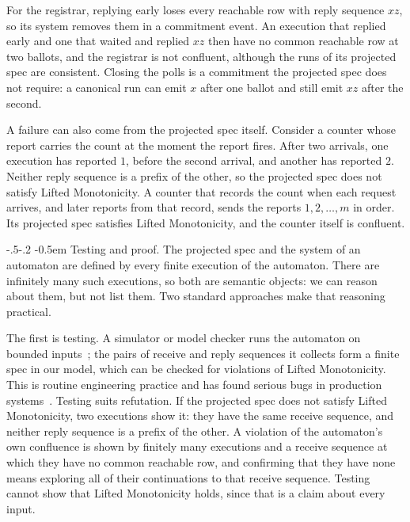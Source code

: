 \documentclass[sigconf]{cidr-2027}
\makeatletter
\theoremstyle{remark}
\renewcommand\paragraph{\@startsection{paragraph}{4}{\z@}%
  {-.5\baselineskip \@plus -2\p@ \@minus -.2\p@}%
  {-0.5em}%
  {\normalfont\bfseries}}
\newcommand{\commitment}{commitment\xspace}
\makeatother
\begin{document}
For the registrar, replying early loses every reachable row with reply
sequence $xz$, so its system removes them in a \commitment event. An execution
that replied early and one that waited and replied $xz$ then have no common
reachable row at two ballots, and the registrar is not confluent, although the
runs of its projected spec are consistent. Closing the polls is a \commitment the projected
spec does not require: a canonical run can emit $x$ after one ballot and still
emit $xz$ after the second.

A failure can also come from the projected spec itself. Consider a counter
whose report carries the count at the moment the report fires. After two
arrivals, one execution has reported $1$, before the second arrival, and
another has reported $2$. Neither reply sequence is a prefix of the other, so
the projected spec does not satisfy Lifted Monotonicity. A counter that records the count when each
request arrives, and later reports from that record, sends the reports
$1,2,\ldots,m$ in order. Its projected spec satisfies Lifted Monotonicity, and the counter
itself is confluent.

\paragraph{Testing and proof.}
The projected spec and the system of an automaton are defined by every finite
execution of the automaton. There are infinitely many such executions, so
both are semantic objects: we can reason about them, but not list them. Two
standard approaches make that reasoning practical.

The first is testing. A simulator or model checker runs the automaton on
bounded inputs~\cite{misra1986des,flanagan2005dpor}; the pairs of receive and
reply sequences it collects form a finite spec in our model, which can be
checked for violations of Lifted Monotonicity. This is routine engineering
practice and has found serious bugs in production
systems~\cite{newcombe2015aws,zhou2021foundationdb}. Testing suits
refutation. If the projected spec does not satisfy Lifted Monotonicity, two
executions show it:
they have the same receive sequence, and neither reply sequence is a prefix of
the other. A violation of the automaton's own confluence is shown by finitely
many executions and a receive sequence at which they have no common reachable
row, and confirming that they have none means exploring all of their
continuations to that receive sequence. Testing cannot show that Lifted
Monotonicity holds, since that is a claim about every input.
\end{document}

